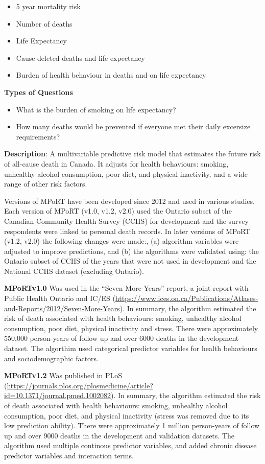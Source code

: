 \documentclass[]{book}
\providecommand{\tightlist}{%
  \setlength{\itemsep}{0pt}\setlength{\parskip}{0pt}}
\begin{document}
\begin{itemize}
\tightlist
\item
  5 year mortality risk
\item
  Number of deaths
\item
  Life Expectancy
\item
  Cause-deleted deaths and life expectancy
\item
  Burden of health behaviour in deaths and on life expectancy
\end{itemize}

\textbf{Types of Questions}

\begin{itemize}
\tightlist
\item
  What is the burden of smoking on life expectancy?
\item
  How many deaths would be prevented if everyone met their daily
  excersize requirements?
\end{itemize}

\textbf{Description}: A multivariable predictive risk model that
estimates the future risk of all-cause death in Canada. It adjusts for
health behaviours: smoking, unhealthy alcohol consumption, poor diet,
and physical inactivity, and a wide range of other risk factors.

Versions of MPoRT have been developed since 2012 and used in various
studies. Each version of MPoRT (v1.0, v1.2, v2.0) used the Ontario
subset of the Canadian Community Health Survey (CCHS) for development
and the survey respondents were linked to personal death records. In
later versions of MPoRT (v1.2, v2.0) the following changes were made:,
(a) algorithm variables were adjusted to improve predictions, and (b)
the algorithms were validated using: the Ontario subset of CCHS of the
years that were not used in development and the National CCHS dataset
(excluding Ontario).

\textbf{MPoRTv1.0} Was used in the ``Seven More Years'' report, a joint
report with Public Health Ontario and IC/ES
(\url{https://www.ices.on.ca/Publications/Atlases-and-Reports/2012/Seven-More-Years}).
In summary, the algorithm estimated the risk of death associated with
health behaviours: smoking, unhealthy alcohol consumption, poor diet,
physical inactivity and stress. There were approximately 550,000
person-years of follow up and over 6000 deaths in the development
dataset. The algorthim used categorical predictor variables for health
behaviours and sociodemographic factors.

\textbf{MPoRTv1.2} Was published in PLoS
(\url{https://journals.plos.org/plosmedicine/article?id=10.1371/journal.pmed.1002082}).
In summary, the algorithm estimated the risk of death associated with
health behaviours: smoking, unhealthy alcohol consumption, poor diet,
and physical inactivity (stress was removed due to its low prediction
ability). There were approximately 1 million person-years of follow up
and over 9000 deaths in the development and validation datasets. The
algorithm used multiple continous predictor variables, and added chronic
disease predictor variables and interaction terms.
\end{document}
